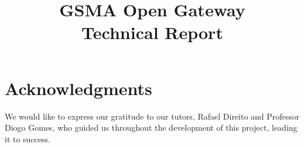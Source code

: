 \documentclass[final, code,math,bibliography,noheader,language=english]{relatorio-deti}
\title{GSMA Open Gateway\\[20pt]Technical Report}
\begin{document}
\maketitle

\chapter*{\Large\centering Acknowledgments}
\thispagestyle{empty}

We would like to express our gratitude to our tutors, Rafael Direito and
Professor Diogo Gomes, who guided us throughout the development of this
project, leading it to success.

\clearpage



\tableofcontents

\clearpage















\printbibliography[heading=bibintoc]
\end{document}
